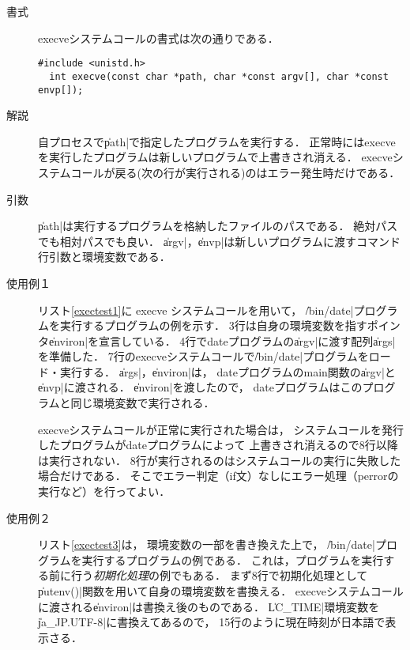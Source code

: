 \begin{description}
\item[書式] execveシステムコールの書式は次の通りである．
\begin{lstlisting}[numbers=none]
  #include <unistd.h>
  int execve(const char *path, char *const argv[], char *const envp[]);
\end{lstlisting}

\item[解説]
  自プロセスで\|path|で指定したプログラムを実行する．
  正常時にはexecveを実行したプログラムは新しいプログラムで上書きされ消える．
  execveシステムコールが戻る(次の行が実行される)のはエラー発生時だけである．

\item[引数]
  \|path|は実行するプログラムを格納したファイルのパスである．
  絶対パスでも相対パスでも良い．
  \|argv|，\|envp|は新しいプログラムに渡すコマンド行引数と環境変数である．

\item[使用例１]
  リスト\ref{exectest1}に execve システムコールを用いて，
  \|/bin/date|プログラムを実行するプログラムの例を示す．
  3行は自身の環境変数を指すポインタ\|environ|を宣言している．
  4行でdateプログラムの\|argv|に渡す配列\|args|を準備した．
  7行のexecveシステムコールで\|/bin/date|プログラムをロード・実行する．
  \|args|，\|environ|は，
  dateプログラムのmain関数の\|argv|と\|envp|に渡される．
  \|environ|を渡したので，
  dateプログラムはこのプログラムと同じ環境変数で実行される．

  execveシステムコールが正常に実行された場合は，
  システムコールを発行したプログラムがdateプログラムによって
  上書きされ消えるので8行以降は実行されない．
  8行が実行されるのはシステムコールの実行に失敗した場合だけである．
  そこでエラー判定（if文）なしにエラー処理（perrorの実行など）を行ってよい．

  

\item[使用例２]
  リスト\ref{exectest3}は，
  環境変数の一部を書き換えた上で，
  \|/bin/date|プログラムを実行するプログラムの例である．
  これは，プログラムを実行する前に行う\emph{初期化処理}の例でもある．
  まず8行で初期化処理として\|putenv()|関数を用いて自身の環境変数を書換える．
  execveシステムコールに渡される\|environ|は書換え後のものである．
  \|LC_TIME|環境変数を\|ja_JP.UTF-8|に書換えてあるので，
  15行のように現在時刻が日本語で表示さる．

  


\end{description}
